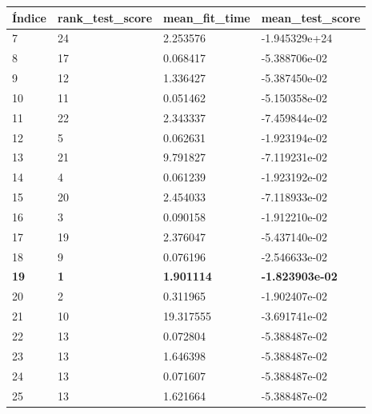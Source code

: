 \documentclass[a4paper,11pt]{article}
\begin{document}
\begin{table}[h]
\begin{tabular}{|l|l|l|l|}
\hline
Índice      & rank\_test\_score & mean\_fit\_time   & mean\_test\_score      \\ \hline
7           & 24                & 2.253576          & -1.945329e+24          \\ \hline
8           & 17                & 0.068417          & -5.388706e-02          \\ \hline
9           & 12                & 1.336427          & -5.387450e-02          \\ \hline
10          & 11                & 0.051462          & -5.150358e-02          \\ \hline
11          & 22                & 2.343337          & -7.459844e-02          \\ \hline
12          & 5                 & 0.062631          & -1.923194e-02          \\ \hline
13          & 21                & 9.791827          & -7.119231e-02          \\ \hline
14          & 4                 & 0.061239          & -1.923192e-02          \\ \hline
15          & 20                & 2.454033          & -7.118933e-02          \\ \hline
16          & 3                 & 0.090158          & -1.912210e-02          \\ \hline
17          & 19                & 2.376047          & -5.437140e-02          \\ \hline
18          & 9                 & 0.076196          & -2.546633e-02          \\ \hline
\textbf{19} & \textbf{1}        & \textbf{1.901114} & \textbf{-1.823903e-02} \\ \hline
20          & 2                 & 0.311965          & -1.902407e-02          \\ \hline
21          & 10                & 19.317555         & -3.691741e-02          \\ \hline
22          & 13                & 0.072804          & -5.388487e-02          \\ \hline
23          & 13                & 1.646398          & -5.388487e-02          \\ \hline
24          & 13                & 0.071607          & -5.388487e-02          \\ \hline
25          & 13                & 1.621664          & -5.388487e-02          \\ \hline
\end{tabular}
\end{table}
\end{document}
